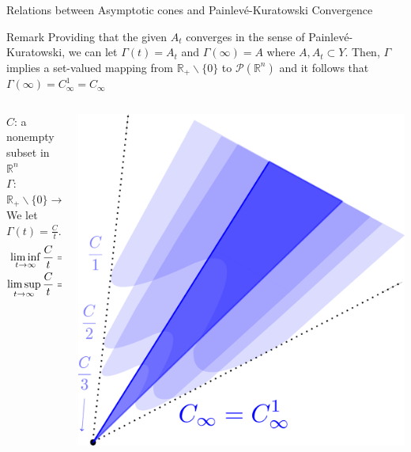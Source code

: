 \documentclass[aspectratio=169, dvipdfmx, 11pt]{beamer} %
\newcommand{\RealNumberSet}{\mathbb{R}}
\newcommand{\NDemenstionalRealEuclideanSpace}{\mathbb{R}^n}
\newcommand{\Painleve}{Painlev\'e}
\begin{document}
\begin{frame}[t]{Relations between Asymptotic cones and \Painleve-Kuratowski Convergence}
  \begin{alertblock}{Remark}
    Providing that the given $A_t$ converges in the sense of \Painleve-Kuratowski, we can let $\Gamma (t) = A_t$ and $\Gamma (\infty) = A$ where $A, A_t \subset Y$.
    Then, $\Gamma$ implies a set-valued mapping from $\RealNumberSet_{+}\backslash\{0\}$ to $\mathcal{P}(\NDemenstionalRealEuclideanSpace)$ and it follows that $\Gamma (\infty) = C^1_{\infty} = C_{\infty}$
  \end{alertblock}

  \begin{columns}
    \begin{column}{0.48\textwidth}
    $C$: a nonempty subset in $\NDemenstionalRealEuclideanSpace$ \\
    $\Gamma$: $\RealNumberSet_{+}\backslash\{0\}  \rightarrow \mathcal{P}(\NDemenstionalRealEuclideanSpace)$ \\
    We let $\Gamma (t) = \frac{C}{t}$. \\
    \pause
    \centering
    \begin{equation}
        \begin{split}
            \liminf_{t \to \infty} \frac{C}{t} &= C^1_{\infty} \\
            \limsup_{t \to \infty}\frac{C}{t} &= C_{\infty} \notag
        \end{split}
    \end{equation}
    \end{column}
    \pause
    \begin{column}{0.48\textwidth}
    \centering
    \includegraphics[keepaspectratio, scale=0.09]{figures/relation_asymptotice_cone_and_p_k_convergence.eps}
    \end{column}
  \end{columns}
\end{frame}
\end{document}

